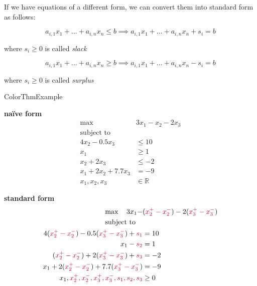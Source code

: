 \documentclass[a4paper, 11pt]{report}
\begin{document}
\begin{gframe}
If we have equations of a different form, we can convert them into standard form as follows:

$$a_{i,1}x_{1} + \dots + a_{i,n}x_{n} \leq b \implies  a_{i,1}x_{1} + \dots + a_{i,n}x_{n} +s_{i} = b$$

where $s_{i} \geq 0$ is called \textit{slack}

$$a_{i,1}x_{1} + \dots + a_{i,n}x_{n} \geq  b \implies  a_{i,1}x_{1} + \dots + a_{i,n}x_{n} -s_{i} = b$$


where $s_{i} \geq 0$ is called \textit{surplus}
\end{gframe}

\begin{cframe}{ColorThm}{Example}
\begin{minipage}[t]{0.42\textwidth}
    \vspace{0pt}
    \textbf{naïve form}
    \begin{align*}
        \max \quad & 3x_1 - x_2 - 2x_3 \\
        \text{subject to} \quad & \\
        4x_2 - 0.5x_3 &\le 10 \\
        x_1 &\ge 1 \\
        x_2 + 2x_3 &\le -2 \\
        x_1 + 2x_2 + 7.7x_3 &= -9 \\
        x_1, x_2, x_3 &\in \mathbb{R}
    \end{align*}
\end{minipage}%
\hfill
\begin{minipage}[t]{0.54\textwidth}
    \vspace{0pt}
    \textbf{standard form}
    \begin{align*}
        \max \quad  3x_1 - & (\textcolor{purple}{x_2^+ - x_2^-}) - 2(\textcolor{purple}{x_3^+ - x_3^-}) \\
        \text{subject to} \quad & \\
        4(\textcolor{purple}{x_2^+ - x_2^-}) - 0.5(\textcolor{purple}{x_3^+ - x_3^-}) + \textcolor{purple}{s_1} &= 10 \\
        x_1 - \textcolor{purple}{s_2} &= 1 \\
        (\textcolor{purple}{x_2^+ - x_2^-}) + 2(\textcolor{purple}{x_3^+ - x_3^-}) + \textcolor{purple}{s_3} &= -2 \\
        x_1 + 2(\textcolor{purple}{x_2^+ - x_2^-}) + 7.7(\textcolor{purple}{x_3^+ - x_3^-}) &= -9 \\
        x_1, \textcolor{purple}{x_2^+, x_2^-, x_3^+, x_3^-, s_1, s_2, s_3} &\ge 0
    \end{align*}
\end{minipage}
\end{cframe}
\end{document}
